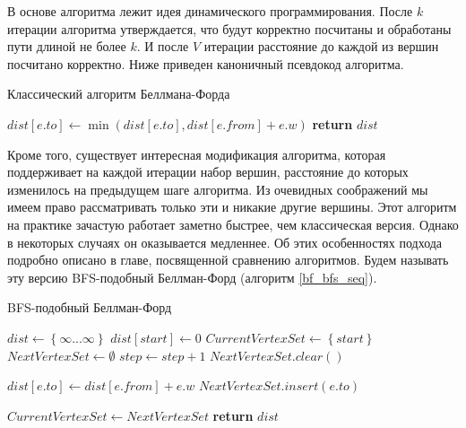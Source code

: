 В основе алгоритма лежит идея динамического программирования. После $k$ итерации алгоритма утверждается, что будут корректно посчитаны и обработаны пути длиной не более $k$. И после $V$ итерации расстояние до каждой из вершин посчитано корректно. Ниже приведен каноничный псевдокод алгоритма. 

\FloatBarrier
\begin{algorithm}
\caption{Классический алгоритм Беллмана-Форда}\label{bf_classic_seq}
\begin{algorithmic}[1]
 
		\State $dist[e.to] \gets \min(dist[e.to], dist[e.from] + e.w)$
	\EndFor
\EndFor
\State \textbf{return} $dist$
\EndProcedure
\end{algorithmic}
\end{algorithm}

\FloatBarrier
Кроме того, существует интересная модификация алгоритма, которая поддерживает на каждой итерации набор вершин, расстояние до которых изменилось на предыдущем шаге алгоритма. Из очевидных соображений мы имеем право рассматривать только эти и никакие другие вершины. Этот алгоритм на практике зачастую работает заметно быстрее, чем классическая версия. Однако в некоторых случаях он оказывается медленнее. Об этих особенностях подхода подробно описано в главе, посвященной сравнению алгоритмов. Будем называть эту версию BFS-подобный Беллман-Форд (алгоритм \ref{bf_bfs_seq}). 

\FloatBarrier
\begin{algorithm}
\caption{BFS-подобный Беллман-Форд}\label{bf_bfs_seq}
\begin{algorithmic}[1]
\State $dist\gets \left\{ {\infty ... \infty}\right\}$
\State $dist[start] \gets 0$
\State $CurrentVertexSet \gets \left\{ {start}\right\}$ 
\State $NextVertexSet \gets \emptyset$ 
	\State $step \gets step + 1$
	\State $NextVertexSet.clear()$
	
		  
				\State $dist[e.to] \gets dist[e.from] + e.w$
				\State $NextVertexSet.insert(e.to)$								
			\EndIf
		\EndFor
	\EndFor
	
	\State $CurrentVertexSet \gets NextVertexSet$	
\EndWhile
\State \textbf{return} $dist$

\EndProcedure
\end{algorithmic}
\end{algorithm}



